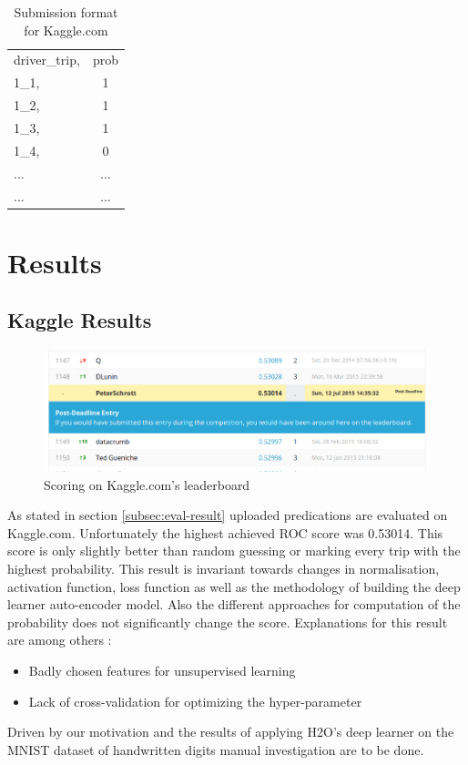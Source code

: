 \documentclass{vldb}
\begin{document}
\begin{table}
\centering
\begin{tabular}{l c}
driver\_trip, & prob\\
1\_1,& 1\\
1\_2,& 1\\
1\_3,& 1\\
1\_4,& 0\\
... & ... \\
... & ... \\
\end{tabular}
\caption{Submission format for Kaggle.com}
\label{table:kaggle-submission}
\end{table}


\section{Results}
\label{sec:Results}


\subsection{Kaggle Results}

\begin{figure}
\centering
\includegraphics[width=\linewidth]{"pics/kaggle-result"}
\caption{Scoring on Kaggle.com's leaderboard}
\label{fig:kaggle-result}
\end{figure}

As stated in section \ref{subsec:eval-result} uploaded predications are evaluated on Kaggle.com. Unfortunately the highest achieved ROC score was 0.53014. This score is only slightly better than random guessing or marking every trip with the highest probability. This result is invariant towards changes in normalisation, activation function, loss function as well as the methodology of building the deep learner auto-encoder model. Also the different approaches for computation of the probability does not significantly change the score. Explanations for this result are among others :
\begin{itemize}
\item Badly chosen features for unsupervised learning
\item Lack of cross-validation for optimizing the hyper-pa\-ra\-me\-ter
\end{itemize}
Driven by our motivation and the results of applying H2O's deep learner on the MNIST dataset of handwritten digits manual investigation are to be done. 
\end{document}
